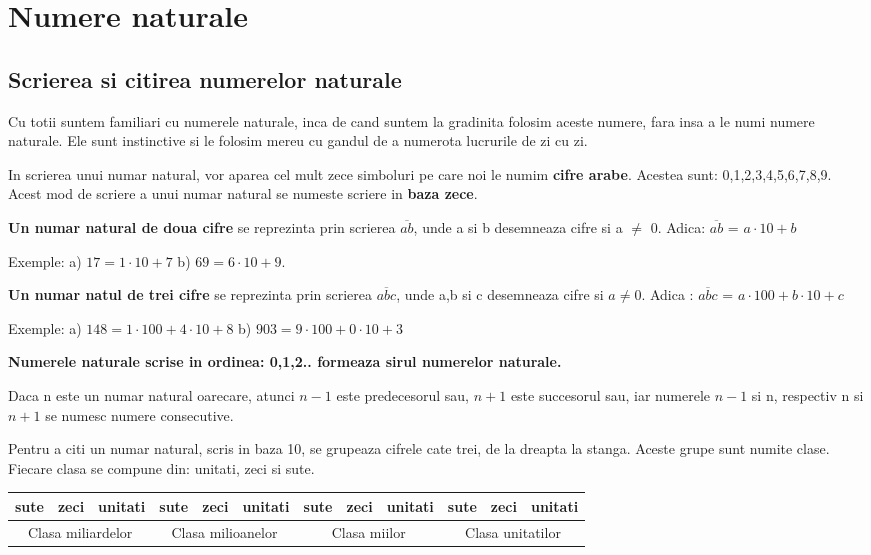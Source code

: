 \documentclass[a4paper,10pt]{article}
\begin{document}
	
	\tableofcontents
	\newpage
	
	\section{Numere naturale}
	\subsection{Scrierea si citirea numerelor naturale}
	
	Cu totii suntem familiari cu numerele naturale, inca de cand suntem la gradinita folosim aceste numere, fara insa a le numi numere naturale. Ele sunt instinctive si le folosim mereu cu gandul de a numerota lucrurile de zi cu zi.
	
	In scrierea unui numar natural, vor aparea cel mult zece simboluri pe care noi le numim \textbf{cifre arabe}. Acestea sunt: 0,1,2,3,4,5,6,7,8,9. Acest mod de scriere a unui numar natural se numeste scriere in \textbf{baza zece}.
	
	\textbf{Un numar natural de doua cifre} se reprezinta prin scrierea $\overline{ab}$, unde a si b desemneaza cifre si a $\neq$ 0. Adica: $\overline{ab}$ = $a\cdot10+b$
	
	Exemple: a) $17 = 1\cdot10+7$  \hspace{2pt} b) $69 = 6\cdot10+9$.
			
	\textbf{Un numar natul de trei cifre} se reprezinta prin scrierea $\overline{abc}$, unde a,b si c desemneaza cifre si $a\neq0$. Adica : $\overline{abc}$ = $a\cdot100+b\cdot10+c$
	
	Exemple: a) $148=1\cdot100+4\cdot10+8$ \hspace{2pt} b) $903=9\cdot100+0\cdot10+3$
	
	\textbf{Numerele naturale scrise in ordinea: 0,1,2.. formeaza sirul numerelor naturale.}
	
	Daca n este un numar natural oarecare, atunci $n-1$ este predecesorul sau, $n+1$ este succesorul sau, iar numerele $n-1$ si n, respectiv n si $n+1$ se numesc numere consecutive.

	Pentru a citi un numar natural, scris in baza 10, se grupeaza cifrele cate trei, de la dreapta la stanga. Aceste grupe sunt numite clase. Fiecare clasa se compune din: unitati, zeci si sute.
			 
	\begin{table}[htb]
		\centering
		\begin{tabular}{|p{0.5cm}|p{0.5cm}|p{0.8cm}|p{0.5cm}|p{0.5cm}|p{0.8cm}|p{0.5cm}|p{0.5cm}|p{0.8cm}|p{0.5cm}|p{0.5cm}|p{0.8cm}|}
			\hline
			sute       & zeci       & unitati       & sute       & zeci       & unitati      & sute     & zeci     & unitati     & sute       & zeci      & unitati      \\ \hline
			\multicolumn{3}{|c|}{Clasa miliardelor} & \multicolumn{3}{c|}{Clasa milioanelor} & \multicolumn{3}{c|}{Clasa miilor} & \multicolumn{3}{c|}{Clasa unitatilor} \\ \hline
		\end{tabular}
	\end{table}
	
\end{document}
